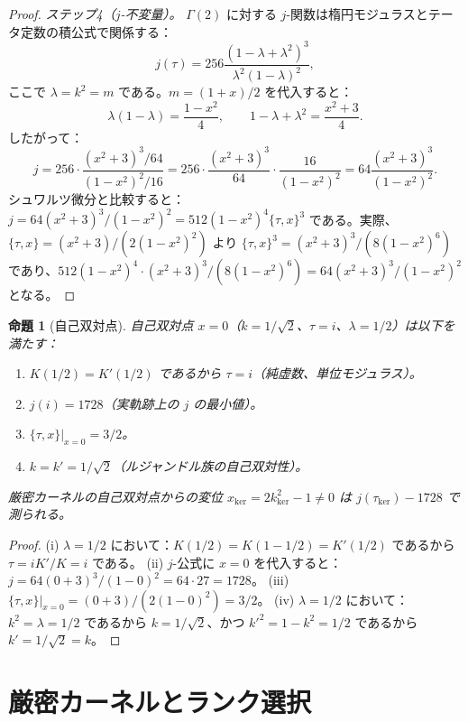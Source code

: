 \documentclass[12pt]{article}
\theoremstyle{plain}
\newtheorem{proposition}[theorem]{命題}
\theoremstyle{definition}
\numberwithin{equation}{section}
\newcommand{\kker}{\mathrm{ker}}
\begin{document}
\begin{proof}
\emph{ステップ4（$j$-不変量）。}
$\Gamma(2)$ に対する $j$-関数は楕円モジュラスとテータ定数の積公式で関係する：
\begin{equation}
j(\tau) = 256\frac{(1-\lambda+\lambda^2)^3}{\lambda^2(1-\lambda)^2},
\end{equation}
ここで $\lambda=k^2=m$ である。$m=(1+x)/2$ を代入すると：
\begin{equation}
\lambda(1-\lambda)=\frac{1-x^2}{4},\qquad 1-\lambda+\lambda^2=\frac{x^2+3}{4}.
\end{equation}
したがって：
\begin{equation}
j = 256\cdot\frac{(x^2+3)^3/64}{(1-x^2)^2/16} = 256\cdot\frac{(x^2+3)^3}{64}\cdot\frac{16}{(1-x^2)^2} = 64\frac{(x^2+3)^3}{(1-x^2)^2}.
\end{equation}
シュワルツ微分と比較すると：$j=64(x^2+3)^3/(1-x^2)^2=512(1-x^2)^4\{\tau,x\}^3$ である。実際、$\{\tau,x\}=(x^2+3)/(2(1-x^2)^2)$ より $\{\tau,x\}^3=(x^2+3)^3/(8(1-x^2)^6)$ であり、$512(1-x^2)^4\cdot(x^2+3)^3/(8(1-x^2)^6)=64(x^2+3)^3/(1-x^2)^2$ となる。
\end{proof}

\begin{proposition}[自己双対点]\label{prop:selfdualpoint}
自己双対点 $x=0$（$k=1/\sqrt{2}$、$\tau=i$、$\lambda=1/2$）は以下を満たす：
\begin{enumerate}[label=(\roman*)]
\item $K(1/2)=K'(1/2)$ であるから $\tau=i$（純虚数、単位モジュラス）。
\item $j(i)=1728$（実軌跡上の $j$ の最小値）。
\item $\{\tau,x\}|_{x=0}=3/2$。
\item $k=k'=1/\sqrt{2}$（ルジャンドル族の自己双対性）。
\end{enumerate}
厳密カーネルの自己双対点からの変位 $x_{\kker}=2k_{\kker}^2-1\neq 0$ は $j(\tau_{\kker})-1728$ で測られる。
\end{proposition}

\begin{proof}
(i) $\lambda=1/2$ において：$K(1/2)=K(1-1/2)=K'(1/2)$ であるから $\tau=iK'/K=i$ である。
(ii) $j$-公式に $x=0$ を代入すると：$j=64(0+3)^3/(1-0)^2=64\cdot 27=1728$。
(iii) $\{\tau,x\}|_{x=0}=(0+3)/(2(1-0)^2)=3/2$。
(iv) $\lambda=1/2$ において：$k^2=\lambda=1/2$ であるから $k=1/\sqrt{2}$、かつ $k'^2=1-k^2=1/2$ であるから $k'=1/\sqrt{2}=k$。
\end{proof}

\section{厳密カーネルとランク選択}\label{sec:strictkernel}
\end{document}
